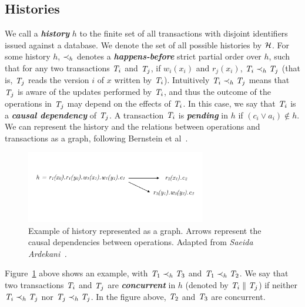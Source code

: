 \subsection{Histories}
\label{sect:histories}

We call a \textbf{\em history} $h$ to the finite set of all transactions with disjoint identifiers issued against a database. We denote the set of all possible histories by $\mathcal{H}$. For some history $h$, $\prec_h$ denotes a \textbf{\em happens-before} strict partial order over $h$, such that for any two transactions $\mathit{T}_i$ and $\mathit{T}_j$, if $w_i(x_i)$ and $r_j(x_i)$, $\mathit{T}_i \prec_h \mathit{T}_j$ (that is, $\mathit{T}_j$ reads the version $i$ of $x$ written by $\mathit{T}_i$). Intuitively $\mathit{T}_i \prec_h \mathit{T}_j$ means that $\mathit{T}_j$ is aware of the updates performed by $\mathit{T}_i$, and thus the outcome of the operations in $\mathit{T}_j$ may depend on the effects of $\mathit{T}_i$. In this case, we say that $\mathit{T}_i$ is a \textbf{\em causal dependency} of $\mathit{T}_j$. A transaction $\mathit{T}_i$ is \textbf{\em pending} in $h$ if $(c_i \vee a_i) \notin h$. We can represent the history and the relations between operations and transactions as a graph, following Bernstein et al~\citep{bernstein_concurrency}.

\begin{figure}[h]
  \centering
  \vspace{-0.4cm}
  \includegraphics[width=0.7\textwidth]{figures/history.pdf}
  \vspace{-1cm}
  \caption{Example of history represented as a graph. Arrows represent the causal dependencies between operations. Adapted from \em{Saeida Ardekani~\citep{ardekani_thesis}}.}
  \label{fig:history}
\end{figure}

Figure~\ref{fig:history} above shows an example, with $\mathit{T}_1 \prec_h \mathit{T}_3$ and $\mathit{T}_1 \prec_h \mathit{T}_2$. We say that two transactions $\mathit{T}_i$ and $\mathit{T}_j$ are \textbf{\em concurrent} in $h$ (denoted by $\mathit{T}_i \parallel \mathit{T}_j$) if neither $\mathit{T}_i \prec_h \mathit{T}_j$ nor $\mathit{T}_j \prec_h \mathit{T}_j$. In the figure above, $\mathit{T}_2$ and $\mathit{T}_3$ are concurrent.


